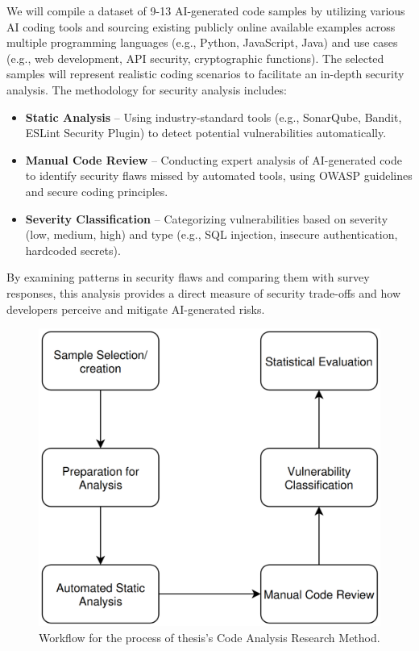 We will compile a dataset of 9-13 AI-generated code samples by utilizing various AI coding tools and sourcing existing publicly online available examples across multiple programming languages (e.g., Python, JavaScript, Java) and use cases (e.g., web development, API security, cryptographic functions). The selected samples will represent realistic coding scenarios to facilitate an in-depth security analysis.
The methodology for security analysis includes:

\begin{itemize}
    \item \textbf{Static Analysis} – Using industry-standard tools (e.g., SonarQube, Bandit, ESLint Security Plugin) to detect potential vulnerabilities automatically.
    \item \textbf{Manual Code Review} – Conducting expert analysis of AI-generated code to identify security flaws missed by automated tools, using OWASP guidelines and secure coding principles.
    \item \textbf{Severity Classification} – Categorizing vulnerabilities based on severity (low, medium, high) and type (e.g., SQL injection, insecure authentication, hardcoded secrets).
\end{itemize}

By examining patterns in security flaws and comparing them with survey responses, this analysis provides a direct measure of security trade-offs and how developers perceive and mitigate AI-generated risks.


\begin{figure}[H]
    \centering
    \includegraphics[width=0.9\columnwidth]{assets/data-analysis.png}
    \caption{Workflow for the process of thesis's Code Analysis Research Method.}
    \label{fig:data_analysis_diagram}
\end{figure}

